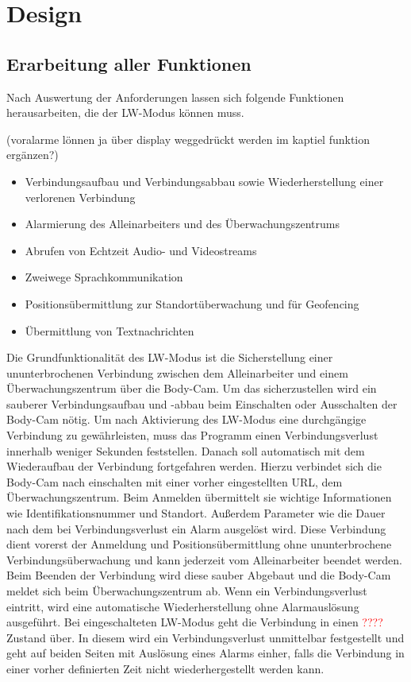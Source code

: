 \documentclass[thesis.tex]{subfiles}
\begin{document}
\chapter{Design}\label{chap:design}

\section{Erarbeitung aller Funktionen}
Nach Auswertung der Anforderungen lassen sich folgende Funktionen herausarbeiten, die der LW-Modus können muss.

(voralarme lönnen ja über display weggedrückt werden im kaptiel funktion ergänzen?)

\begin{itemize}
    \item Verbindungsaufbau und Verbindungsabbau sowie Wiederherstellung einer verlorenen Verbindung
    \item Alarmierung des Alleinarbeiters und des Überwachungszentrums
    \item Abrufen von Echtzeit Audio- und Videostreams
    \item Zweiwege Sprachkommunikation
    \item Positionsübermittlung zur Standortüberwachung und für Geofencing
    \item Übermittlung von Textnachrichten
\end{itemize}

Die Grundfunktionalität des LW-Modus ist die Sicherstellung einer ununterbrochenen Verbindung zwischen dem Alleinarbeiter und einem Überwachungszentrum über die Body-Cam.
Um das sicherzustellen wird ein sauberer Verbindungsaufbau und -abbau beim Einschalten oder Ausschalten der Body-Cam nötig.
Um nach Aktivierung des LW-Modus eine durchgängige Verbindung zu gewährleisten, muss das Programm einen Verbindungsverlust innerhalb weniger Sekunden feststellen.
Danach soll automatisch mit dem Wiederaufbau der Verbindung fortgefahren werden.
Hierzu verbindet sich die Body-Cam nach einschalten mit einer vorher eingestellten URL, dem Überwachungszentrum.
Beim Anmelden übermittelt sie wichtige Informationen wie Identifikationsnummer und Standort.
Außerdem Parameter wie die Dauer nach dem bei Verbindungsverlust ein Alarm ausgelöst wird.
Diese Verbindung dient vorerst der Anmeldung und Positionsübermittlung ohne ununterbrochene Verbindungsüberwachung und kann jederzeit vom Alleinarbeiter beendet werden.
Beim Beenden der Verbindung wird diese sauber Abgebaut und die Body-Cam meldet sich beim Überwachungszentrum ab.
Wenn ein Verbindungsverlust eintritt, wird eine automatische Wiederherstellung ohne Alarmauslösung ausgeführt.
Bei eingeschalteten LW-Modus geht die Verbindung in einen \textcolor{red}{????} Zustand über.
In diesem wird ein Verbindungsverlust unmittelbar festgestellt und geht auf beiden Seiten mit Auslösung eines Alarms einher, falls die Verbindung in einer vorher definierten Zeit nicht wiederhergestellt werden kann.
\\
\end{document}
